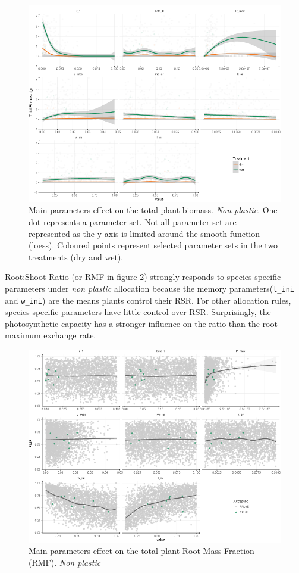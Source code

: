 \begin{figure}\label{fig:sensitivity_BM}
\includegraphics[width = \textwidth]{./2_PP/Figures/Calibration/par_effect_none_BM.png}
\caption{Main parameters effect on the total plant biomass. \textit{Non plastic}. One dot represents a parameter set. Not all parameter set are represented as the y axis is limited around the smooth function (loess). Coloured points represent selected parameter sets in the two treatments (\textcolor{myOrange}{dry} and \textcolor{myGreen}{wet}).}
\end{figure}

Root:Shoot Ratio (or RMF in figure \ref{fig:sensitivity_RSR}) strongly responds to species-specific parameters under \textit{non plastic} allocation because the memory parameters(\texttt{l\_ini} and \texttt{w\_ini}) are the means plants control their RSR. For other allocation rules, species-specific parameters have little control over RSR. Surprisingly, the photosynthetic capacity has a stronger influence on the ratio than the root maximum exchange rate.


\begin{figure}\label{fig:sensitivity_RSR}
\includegraphics[width = \textwidth]{./2_PP/Figures/Calibration/par_effect_none_RSR.png}
\caption{Main parameters effect on the total plant Root Mass Fraction (RMF). \textit{Non plastic}}
\end{figure}

